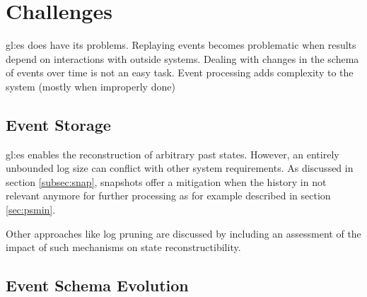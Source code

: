 
\section{Challenges}

\gls{gl:es} does have its problems. Replaying events becomes problematic when results depend on interactions with outside systems. Dealing with changes in the schema of events over time is not an easy task. Event processing adds complexity to the system (mostly when improperly done)~\citep{esvsed}

\subsection{Event Storage}

\gls{gl:es} enables the reconstruction of arbitrary past states. However, an entirely unbounded log size can conflict with other system requirements. As discussed in section \ref{subsec:snap}, snapshots offer a mitigation when the history in not relevant anymore for further processing as for example described in section \ref{sec:psmin}.

Other approaches like log pruning are discussed by \citep{10.1145/3210284.3219767} including an assessment of the impact of such mechanisms on state reconstructibility.


\subsection{Event Schema Evolution}

